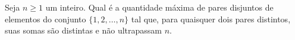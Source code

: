 Seja $n \geq 1$ um inteiro. Qual é a quantidade máxima de pares disjuntos de elementos do conjunto $\{ 1,2,\ldots , n \}$ tal que, para quaisquer dois pares distintos, suas somas são distintas e não ultrapassam $n$.
